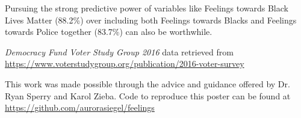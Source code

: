 \documentclass[a0,portrait]{a0poster}
\begin{document}
\begin{multicols}{2}
\vspace{0.5cm}
\noindent
Pursuing the strong predictive power of variables like Feelings towards Black Lives Matter (88.2\%) over including both Feelings towards Blacks and Feelings towards Police together (83.7\%) can also be worthwhile.

\begin{thebibliography}{9}
\textit{Democracy Fund Voter Study Group 2016} data retrieved from \url{https://www.voterstudygroup.org/publication/2016-voter-survey}
\end{thebibliography}

\vspace{0.5cm}
\noindent
This work was made possible through the advice and guidance offered by Dr. Ryan Sperry and Karol Zieba. Code to reproduce this poster can be found at \url{https://github.com/aurorasiegel/feelings}

\end{multicols}
\end{document}
